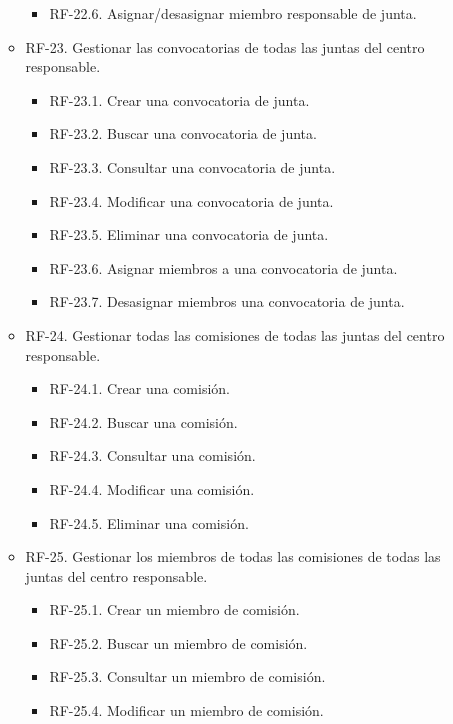 \begin{itemize}
\begin{itemize}
\begin{itemize}
                  \item RF-22.6. Asignar/desasignar miembro responsable de junta.
             \end{itemize}  
         \item RF-23. Gestionar las convocatorias de todas las juntas del centro responsable.
             \begin{itemize}
                  \item RF-23.1. Crear una convocatoria de junta.
                  \item RF-23.2. Buscar una convocatoria de junta.
                  \item RF-23.3. Consultar una convocatoria de junta.
                  \item RF-23.4. Modificar una convocatoria de junta.
                  \item RF-23.5. Eliminar una convocatoria de junta.
                  \item RF-23.6. Asignar miembros a una convocatoria de junta.
                  \item RF-23.7. Desasignar miembros una convocatoria de junta.
             \end{itemize}
        \item RF-24. Gestionar todas las comisiones de todas las juntas del centro responsable.
             \begin{itemize}
                  \item RF-24.1. Crear una comisión.
                  \item RF-24.2. Buscar una comisión.
                  \item RF-24.3. Consultar una comisión.
                  \item RF-24.4. Modificar una comisión.
                  \item RF-24.5. Eliminar una comisión.
             \end{itemize}    
          \item RF-25. Gestionar los miembros de todas las comisiones de todas las juntas del centro responsable.
             \begin{itemize}
                  \item RF-25.1. Crear un miembro de comisión.
                  \item RF-25.2. Buscar un miembro de comisión.
                  \item RF-25.3. Consultar un miembro de comisión.
                  \item RF-25.4. Modificar un miembro de comisión.

\end{itemize}
\end{itemize}
\end{itemize}
